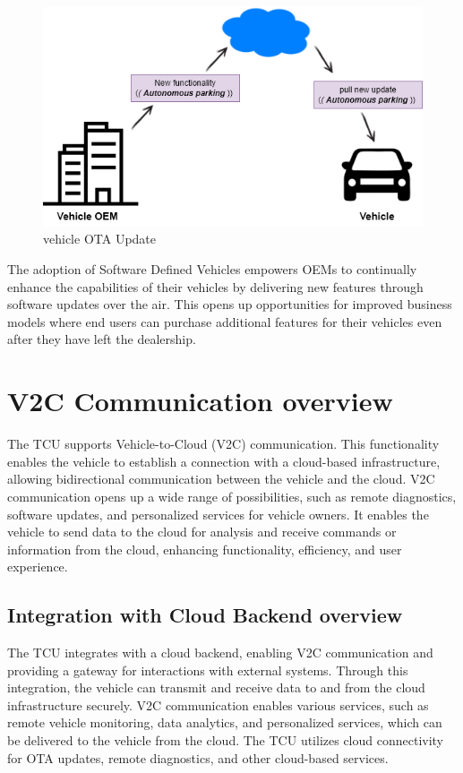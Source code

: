 \documentclass[
12pt,
oneside, 
onehalfspacing, 
nolistspacing, 
parskip, 
chapterinoneline, 
]{AASTCOMPUTER}
\begin{document}
\begin{figure}[!ht]
\centering
\includegraphics[scale=0.5]{Figures/1.png}
\caption[vehicle OTA Update]{vehicle OTA Update}
\label{fig:TCU}
\end{figure}

The adoption of Software Defined Vehicles empowers OEMs to continually enhance the capabilities of their vehicles by delivering new features through software updates over the air. This opens up opportunities for improved business models where end users can purchase additional features for their vehicles even after they have left the dealership.



\section{V2C Communication overview}
The TCU supports Vehicle-to-Cloud (V2C) communication. This functionality enables the vehicle to establish a connection with a cloud-based infrastructure, allowing bidirectional communication between the vehicle and the cloud. V2C communication opens up a wide range of possibilities, such as remote diagnostics, software updates, and personalized services for vehicle owners. It enables the vehicle to send data to the cloud for analysis and receive commands or information from the cloud, enhancing functionality, efficiency, and user experience.

\subsection{Integration with Cloud Backend overview}
The TCU integrates with a cloud backend, enabling V2C communication and providing a gateway for interactions with external systems. Through this integration, the vehicle can transmit and receive data to and from the cloud infrastructure securely. V2C communication enables various services, such as remote vehicle monitoring, data analytics, and personalized services, which can be delivered to the vehicle from the cloud. The TCU utilizes cloud connectivity for OTA updates, remote diagnostics, and other cloud-based services.
\end{document}
